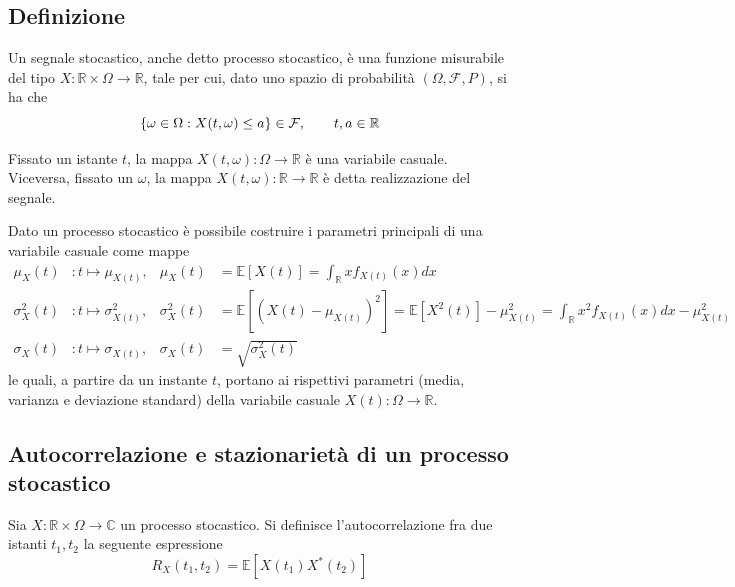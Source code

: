         \begin{definition}
        \end{definition}

        \begin{definition}
        \end{definition}

    \subsection{Definizione}
    \begin{definition}
        Un segnale stocastico, anche detto processo stocastico, è una funzione misurabile del tipo $X: \mathbb{R} \times \Omega \rightarrow \mathbb{R}$, tale per cui, dato uno spazio di probabilità $(\Omega, \mathcal{F}, P)$, si ha che
        \[
            \{\omega \in \Omega \mathrel{:} X(t, \omega) \leq a \} \in \mathcal{F}, \qquad t, a \in \mathbb{R}
        \]
        
        Fissato un istante $t$, la mappa $X(t, \omega): \Omega \rightarrow \mathbb{R}$ è una variabile casuale.
        Viceversa, fissato un $\omega$, la mappa $X(t, \omega): \mathbb{R} \rightarrow \mathbb{R}$ è detta realizzazione del segnale.
    \end{definition}

    Dato un processo stocastico è possibile costruire i parametri principali di una variabile casuale come mappe
    \[
        \begin{aligned}
            \mu_{X}(t) &: t \mapsto \mu_{X(t)}, & \mu_{X}(t) &= \mathbb{E}[X(t)] = \int_{\mathbb{R}} x f_{X(t)}(x) dx \\
            \sigma_{X}^2(t) &: t \mapsto \sigma_{X(t)}^2, & \sigma_{X}^2(t) &= \mathbb{E}[(X(t) - \mu_{X(t)})^2] = \mathbb{E}[X^2(t)] - \mu_{X(t)}^2 = \int_{\mathbb{R}} x^2 f_{X(t)}(x) dx - \mu_{X(t)}^2 \\
            \sigma_{X}(t) &: t \mapsto \sigma_{X(t)}, & \sigma_{X}(t) &= \sqrt{\sigma_{X}^2(t)}
        \end{aligned}
    \]
    le quali, a partire da un instante $t$, portano ai rispettivi parametri (media, varianza e deviazione standard) della variabile casuale $X(t): \Omega \rightarrow \mathbb{R}$.

    \subsection{Autocorrelazione e stazionarietà di un processo stocastico}
    \begin{definition}
        Sia $X: \mathbb{R} \times \Omega \rightarrow \mathbb{C}$ un processo stocastico.
        Si definisce l'autocorrelazione fra due istanti $t_1, t_2$ la seguente espressione
        \[
            R_{X}(t_1, t_2) = \mathbb{E}[X(t_1)X^*(t_2)]
        \]
    \end{definition}

